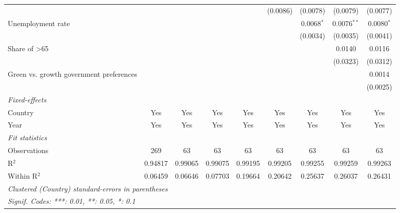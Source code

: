 \begin{table}[htbp]
\begin{tabular}{lcccccccc}
                                                                       &               &                &          &              & (0.0086)     & (0.0078)     & (0.0079)      & (0.0077)\\   
      Unemployment rate                                                &               &                &          &              &              & 0.0068$^{*}$ & 0.0076$^{**}$ & 0.0080$^{*}$\\   
                                                                       &               &                &          &              &              & (0.0034)     & (0.0035)      & (0.0041)\\   
      Share of >65                                                     &               &                &          &              &              &              & 0.0140        & 0.0116\\   
                                                                       &               &                &          &              &              &              & (0.0323)      & (0.0312)\\   
      Green vs. growth government preferences                          &               &                &          &              &              &              &               & 0.0014\\   
                                                                       &               &                &          &              &              &              &               & (0.0025)\\   
      \midrule
      \emph{Fixed-effects}\\
      Country                                                          & Yes           & Yes            & Yes      & Yes          & Yes          & Yes          & Yes           & Yes\\  
      Year                                                             & Yes           & Yes            & Yes      & Yes          & Yes          & Yes          & Yes           & Yes\\  
      \midrule
      \emph{Fit statistics}\\
      Observations                                                     & 269           & 63             & 63       & 63           & 63           & 63           & 63            & 63\\  
      R$^2$                                                            & 0.94817       & 0.99065        & 0.99075  & 0.99195      & 0.99205      & 0.99255      & 0.99259       & 0.99263\\  
      Within R$^2$                                                     & 0.06459       & 0.06646        & 0.07703  & 0.19664      & 0.20642      & 0.25637      & 0.26037       & 0.26431\\  
      \midrule \midrule
      \multicolumn{9}{l}{\emph{Clustered (Country) standard-errors in parentheses}}\\
      \multicolumn{9}{l}{\emph{Signif. Codes: ***: 0.01, **: 0.05, *: 0.1}}\\
   \end{tabular}
\end{table}


